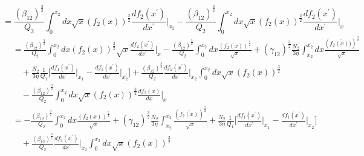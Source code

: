 \documentclass[fleqn, 10pt]{article}
\begin{document}
\begin{equation*}
    = \frac{(\beta_{12})^\frac{3}{2}}{Q_{2}} \int^{x_{2}}_{0} dx \sqrt{x} (f_{2}(x))^\frac{3}{2} \frac{df_{2}(x^\prime)}{dx^\prime} \biggr|_{x_{2}} - \frac{(\beta_{12})^\frac{3}{2}}{Q_{2}} \int^{x_{2}}_{0} dx \sqrt{x} (f_{2}(x))^\frac{3}{2} \frac{df_{2}(x^\prime)}{dx^\prime}\biggr|_{x}
\end{equation*}
\begin{equation}
\begin{split}
     & = \frac{(\beta_{12})^\frac{3}{2}}{Q_{2}}\int^{x_{2}}_{0} dx (f_{2}(x))^\frac{3}{2} \sqrt{x} \frac{df_{2}(x^\prime)}{dx^\prime} \biggr|_{x} - \frac{(\beta_{12})^\frac{3}{2}}{Q_{2}}\int^{x_{2}}_{0} dx \frac{(f_{2}(x))^\frac{5}{2}}{\sqrt{x}} + (\gamma_{1\overline{2}})^\frac{3}{2} \frac{N_{2}}{3\eta}\int^{\overline{x_{2}}}_{x_{2}}dx \frac{(\overline{f_{2}(x))})^\frac{3}{2}}{\sqrt{x}} \\ & \quad + \frac{N_{2}}{3\eta} \frac{1}{Q_{1}} \biggl[ \frac{df_{1}(x^\prime)}{dx^\prime}\biggr|_{x_{1}} - \frac{df_{1}(x^\prime)}{dx^\prime}\biggr|_{\overline{x_{2}}} \biggr] + \frac{(\beta_{12})^\frac{3}{2}}{Q_{2}} \frac{df_{2}(x^\prime)}{dx^\prime}\biggr|_{x_{2}}\int^{x_{2}}_{0} dx \sqrt{x} (f_{2}(x))^\frac{3}{2} \\ & \quad - \frac{(\beta_{12})^\frac{3}{2}}{Q_{2}} \int^{x_{2}}_{0} dx \sqrt{x} (f_{2}(x))^\frac{3}{2} \frac{df_{2}(x)}{dx}\biggr|_{x}
    \end{split}
 \end{equation}
 \begin{equation*}
 \begin{split}
      & = -\frac{(\beta_{12})^\frac{3}{2}}{Q_{2}}\int^{x_{2}}_{0} dx \frac{(f_{2}(x))^\frac{5}{2}}{\sqrt{x}} + (\gamma_{1\overline{2}})^\frac{3}{2} \frac{N_{2}}{3\eta} \int^{\overline{x_{2}}}_{x_{2}}\frac{(\overline{f_{2}(x)})^\frac{3}{2}}{\sqrt{x}} + \frac{N_{2}}{3\eta}\frac{1}{Q_{1}}\biggl[ \frac{df_{1}(x^\prime)}{dx^\prime}\biggr|_{x_{1}} - \frac{df_{1}(x^\prime)}{dx^\prime}\biggr|_{\overline{x_{2}}}\biggr] \\ & \quad + \frac{(\beta_{12})^\frac{3}{2}}{Q_{2}}\frac{df_{2}(x^\prime)}{dx^\prime}\biggr|_{x_{2}}\int^{x_{2}}_{0}dx \sqrt{x} (f_{2}(x))^\frac{3}{2}
     \end{split}
 \end{equation*}
\end{document}
